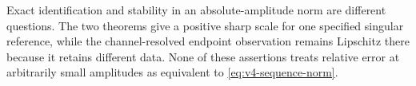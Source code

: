 Exact identification and stability in an absolute-amplitude norm are
different questions. The two theorems give a positive sharp scale for
one specified singular reference, while the channel-resolved endpoint
observation remains Lipschitz there because it retains different data.
None of these assertions treats relative error at arbitrarily small
amplitudes as equivalent to \eqref{eq:v4-sequence-norm}.
